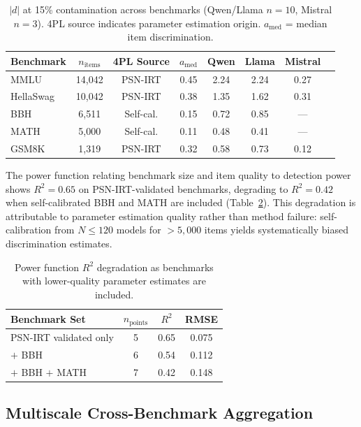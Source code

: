 \documentclass[11pt,a4paper]{article}
\begin{document}
\begin{table}[t]
\centering
\caption{$|d|$ at 15\% contamination across benchmarks (Qwen/Llama $n{=}10$, Mistral $n{=}3$). 4PL source indicates parameter estimation origin. $a_{\text{med}}$ = median item discrimination.}
\label{tab:cross-benchmark}
\small
\begin{tabular}{lccccccc}
\toprule
\textbf{Benchmark} & \textbf{$n_{\text{items}}$} & \textbf{4PL Source} & \textbf{$a_{\text{med}}$} & \textbf{Qwen} & \textbf{Llama} & \textbf{Mistral} \\
\midrule
MMLU      & 14,042 & PSN-IRT    & 0.45 & 2.24 & 2.24 & 0.27 \\
HellaSwag & 10,042 & PSN-IRT    & 0.38 & 1.35 & 1.62 & 0.31 \\
BBH       & 6,511  & Self-cal.  & 0.15 & 0.72 & 0.85 & --- \\
MATH      & 5,000  & Self-cal.  & 0.11 & 0.48 & 0.41 & --- \\
GSM8K     & 1,319  & PSN-IRT    & 0.32 & 0.58 & 0.73 & 0.12 \\
\bottomrule
\end{tabular}
\end{table}

The power function relating benchmark size and item quality to detection power shows $R^2=0.65$ on PSN-IRT-validated benchmarks, degrading to $R^2=0.42$ when self-calibrated BBH and MATH are included (Table~\ref{tab:power-r2}).
This degradation is attributable to parameter estimation quality rather than method failure: self-calibration from $N\leq120$ models for $>5,000$ items yields systematically biased discrimination estimates.

\begin{table}[t]
\centering
\caption{Power function $R^2$ degradation as benchmarks with lower-quality parameter estimates are included.}
\label{tab:power-r2}
\small
\begin{tabular}{lccc}
\toprule
\textbf{Benchmark Set} & \textbf{$n_{\text{points}}$} & \textbf{$R^2$} & \textbf{RMSE} \\
\midrule
PSN-IRT validated only & 5 & 0.65 & 0.075 \\
$+$ BBH                & 6 & 0.54 & 0.112 \\
$+$ BBH $+$ MATH       & 7 & 0.42 & 0.148 \\
\bottomrule
\end{tabular}
\end{table}

\subsection{Multiscale Cross-Benchmark Aggregation}
\end{document}
